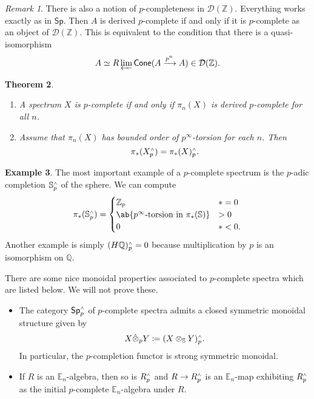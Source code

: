 \documentclass[10pt, oneside]{memoir}
\newtheorem{thm}{Theorem}[subsection]
\theoremstyle{definition}
\newtheorem{exm}[thm]{Example}
\theoremstyle{remark}
\newtheorem{rmk}[thm]{Remark}
\theoremstyle{plain}
\theoremstyle{definition}
\theoremstyle{remark}
\newcommand{\Z}{\mathbb{Z}}
\newcommand{\Q}{\mathbb{Q}}
\newcommand{\E}{\mathbb{E}}
\newcommand{\bS}{\mathbb{S}}
\newcommand{\mc}[1]{\mathcal{#1}}
\newcommand{\ms}[1]{\mathsf{#1}}
\newcommand{\1}{\mathbf{1}}
\newcommand{\2}{\mathbf{2}}
\newcommand{\3}{\mathbf{3}}
\newcommand{\sw}{\mathsmaller{\wedge}}
\begin{document}
\begin{rmk}
    There is also a notion of $p$-completeness in $\mc{D}(\Z)$. Everything works exactly as in $\ms{Sp}$. Then $A$ is derived $p$-complete if and only if it is $p$-complete as an object of $\mc{D}(\Z)$. This is equivalent to the condition that there is a quasi-isomorphism
    \[ A \simeq R\varprojlim \ms{Cone}(A \xrightarrow{p^n} A) \in \mc{D}(\Z). \]
\end{rmk}

\begin{thm}\leavevmode
    \begin{enumerate}
        \item A spectrum $X$ is $p$-complete if and only if $\pi_n (X)$ is derived $p$-complete for all $n$.
        \item Assume that $\pi_n(X)$ has bounded order of $p^{\infty}$-torsion for each $n$. Then
        \[ \pi_* (X_p^{\sw}) = \pi_*(X)_p^{\sw}. \]
    \end{enumerate}
\end{thm}

\begin{exm}
    The most important example of a $p$-complete spectrum is the $p$-adic completion $\bS_p^{\sw}$ of the sphere. We can compute
    \[ \pi_*(\bS_p^{\sw}) = \begin{cases}
        \Z_p & *=0 \\
        \ab\{\text{$p^{\infty}$-torsion in } \pi_*(\bS) \} & > 0 \\
        0 & * < 0.
    \end{cases} \]
    Another example is simply $(H\Q)_p^{\sw} = 0$ because multiplication by $p$ is an isomorphism on $\Q$.
\end{exm}

There are some nice monoidal properties associated to $p$-complete spectra which are listed below. We will not prove these.
\begin{itemize}
    \item The category $\ms{Sp}_p^{\sw}$ of $p$-complete spectra admits a closed symmetric monoidal structure given by
    \[ X \hat{\otimes}_p Y \coloneqq (X \otimes_{\bS} Y)_p^{\sw}. \]
    In particular, the $p$-completion functor is strong symmetric monoidal.
    \item If $R$ is an $\E_n$-algebra, then so is $R_p^{\sw}$ and $R \to R_p^{\sw}$ is an $\E_n$-map exhibiting $R_p^{\sw}$ as the initial $p$-complete $\E_n$-algebra under $R$.
\end{itemize}
\end{document}
